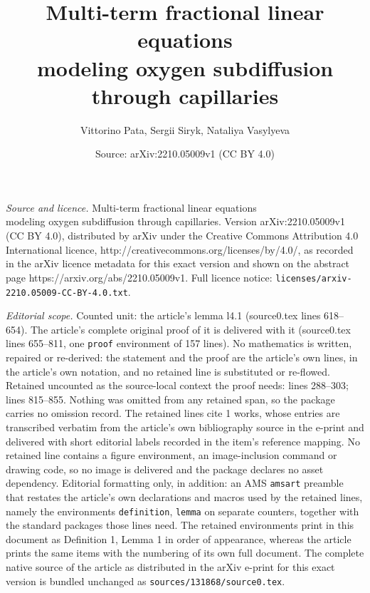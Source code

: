 \documentclass[10pt,a4paper]{amsart}
\title{Multi-term fractional linear equations\\ modeling oxygen subdiffusion through capillaries}
\author{Vittorino Pata, Sergii Siryk, Nataliya Vasylyeva}
\date{Source: arXiv:2210.05009v1 (CC BY 4.0)}
\begin{document}
\maketitle

\noindent\emph{Source and licence.} Multi-term fractional linear equations\\ modeling oxygen subdiffusion through capillaries. Version arXiv:2210.05009v1 (CC BY 4.0), distributed by arXiv under the Creative Commons Attribution 4.0 International licence, http://creativecommons.org/licenses/by/4.0/, as recorded in the arXiv licence metadata for this exact version and shown on the abstract page https://arxiv.org/abs/2210.05009v1. Full licence notice: \texttt{licenses/arxiv-2210.05009-CC-BY-4.0.txt}.\par\smallskip

\noindent\textit{Editorial scope.} Counted unit: the article's lemma l4.1 (source0.tex lines 618--654). The article's complete original proof of it is delivered with it (source0.tex lines 655--811, one \texttt{proof} environment of 157 lines). No mathematics is written, repaired or re-derived: the statement and the proof are the article's own lines, in the article's own notation, and no retained line is substituted or re-flowed.  Retained uncounted as the source-local context the proof needs: lines 288--303; lines 815--855.  Nothing was omitted from any retained span, so the package carries no omission record.  The retained lines cite 1 works, whose entries are transcribed verbatim from the article's own bibliography source in the e-print and delivered with short editorial labels recorded in the item's reference mapping.  No retained line contains a figure environment, an image-inclusion command or drawing code, so no image is delivered and the package declares no asset dependency.  Editorial formatting only, in addition: an AMS \texttt{amsart} preamble that restates the article's own declarations and macros used by the retained lines, namely the environments \texttt{definition}, \texttt{lemma} on separate counters, together with the standard packages those lines need.  The retained environments print in this document as Definition 1, Lemma 1 in order of appearance, whereas the article prints the same items with the numbering of its own full document.  The complete native source of the article as distributed in the arXiv e-print for this exact version is bundled unchanged as \texttt{sources/131868/source0.tex}.
\end{document}
